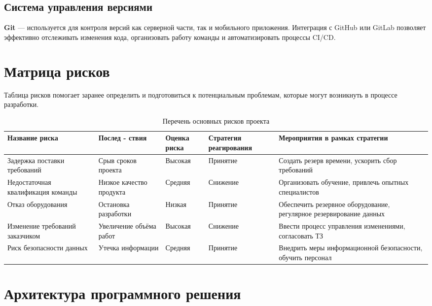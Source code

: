 \subsection{Система управления версиями}
\textbf{Git} — используется для контроля версий как серверной части, так и мобильного приложения. Интеграция с GitHub или GitLab позволяет эффективно отслеживать изменения кода, организовать работу команды и автоматизировать процессы CI/CD.

\section{Матрица рисков}

Таблица рисков помогает заранее определить
и подготовиться к потенциальным проблемам,
которые могут возникнуть в процессе разработки.

\begin{table}[h]
	\centering
	\caption{Перечень основных рисков проекта}
	\label{tab:risk_table}
	\begin{tabular}{|p{3cm}|p{2.5cm}|p{2.5cm}|p{3cm}|p{4cm}|}
		\hline
		\textbf{Название риска} & \textbf{Послед - ствия} & \textbf{Оценка риска} & \textbf{Стратегия реагирования} & \textbf{Мероприятия в рамках стратегии} \\ \hline
		Задержка поставки требований & Срыв сроков проекта & Высокая & Принятие & Создать резерв времени, ускорить сбор требований \\ \hline
		Недостаточная квалификация команды & Низкое качество продукта & Средняя & Снижение & Организовать обучение, привлечь опытных специалистов \\ \hline
		Отказ оборудования & Остановка разработки & Низкая & Принятие & Обеспечить резервное оборудование, регулярное резервирование данных \\ \hline
		Изменение требований заказчиком & Увеличение объёма работ & Высокая & Снижение & Ввести процесс управления изменениями, согласовать ТЗ \\ \hline
		Риск безопасности данных & Утечка информации & Средняя & Принятие & Внедрить меры информационной безопасности, обучить персонал \\ \hline
	\end{tabular}
\end{table}
\clearpage

\section{Архитектура программного решения}


